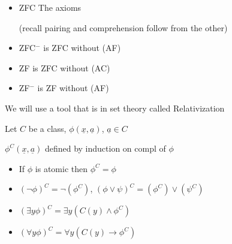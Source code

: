 \begin{itemize}
    \item ZFC The axioms 
    (recall pairing and comprehension follow from the other)

    \item ZFC$^-$ is  ZFC without (AF)
    \item ZF is ZFC without (AC)
    \item ZF$^-$ is ZF without (AF)
\end{itemize}

We will use a tool that is in set theory called Relativization

Let $C$ be a class, $\phi(\underline{x},\underline{a})$, $\underline{a}\in C$

$\phi^C(\underline{x},\underline{a})$ defined by induction on compl of $\phi$
\begin{itemize}
    \item If $\phi$ is atomic then $\phi^C = \phi$
    \item $(\lnot \phi)^C = \lnot (\phi^C)$,  $( \phi\lor \psi)^C =  (\phi^C)\lor(\psi^C)$  
    \item $(\exists y \phi)^C = \exists y (C(y)\land \phi^C)$
    \item $(\forall y \phi)^C = \forall y (C(y)\to \phi^C)$
\end{itemize}


